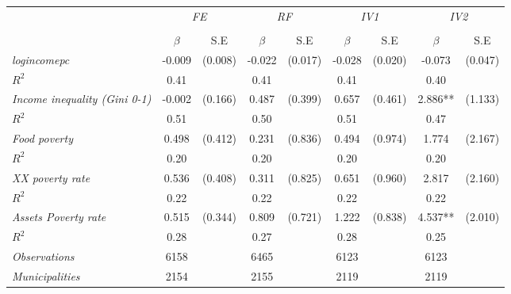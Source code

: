 
\begin{tabular}{lcccccccc}


\hline
\hline

\multicolumn{1}{l}{} & \multicolumn{2}{c}{\textit{FE}} & \multicolumn{2}{c}{\textit{RF}} & \multicolumn{2}{c}{\textit{IV1}} & \multicolumn{2}{c}{\textit{IV2}}  \\ 
\cmidrule(l{1mm}r{1mm}){2-3} \cmidrule(l{1mm}r{1mm}){4-5} \cmidrule(l{1mm}r{1mm}){6-7}  \cmidrule(l{1mm}r{1mm}){8-9}  \\
& $\beta$ & S.E & $\beta$ & S.E & $\beta$ & S.E & $\beta$ & S.E \\
\hline


\textit{logincomepc}    &  -0.009    & (0.008)      &   -0.022        &  (0.017)      &     -0.028  &    (0.020) &     -0.073  &    (0.047)   \\
$R^{2}$			         &  0.41   & 	   &     0.41   	&		 &     0.41   & &     0.40   &  \\
					
\textit{Income inequality (Gini 0-1)}    &  -0.002    & (0.166)      &   0.487        &  (0.399)      &     0.657  &    (0.461)  &     2.886**  &    (1.133) \\
$R^{2}$			         &  0.51   & 	   &     0.50   	&		 &     0.51   & &     0.47   &  \\
					
\textit{Food poverty}    &  0.498    & (0.412)      &   0.231        &  (0.836)      &     0.494  &    (0.974)  &     1.774  &    (2.167) \\
$R^{2}$			         &  0.20   & 	   &     0.20   	&		 &     0.20   & &     0.20   &  \\
					
\textit{XX poverty rate}    &  0.536    & (0.408)      &   0.311        &  (0.825)      &     0.651  &    (0.960)  &     2.817  &    (2.160) \\
$R^{2}$			         &  0.22   & 	   &     0.22   	&		 &     0.22   & &     0.22   &  \\
					
\textit{Assets Poverty rate}    &  0.515    & (0.344)      &   0.809        &  (0.721)      &     1.222  &    (0.838) &     4.537**  &    (2.010)  \\
$R^{2}$			         &  0.28   & 	   &     0.27   	&		 &     0.28   &   &     0.25   &  \\


\hline		

\textit{Observations}                 &   6158    &  & 6465    &  &  6123   &  & 6123   &		\\
\textit{Municipalities}               &   2154   &  & 2155   &  &  2119  &  & 2119  &		\\


\end{tabular}%
